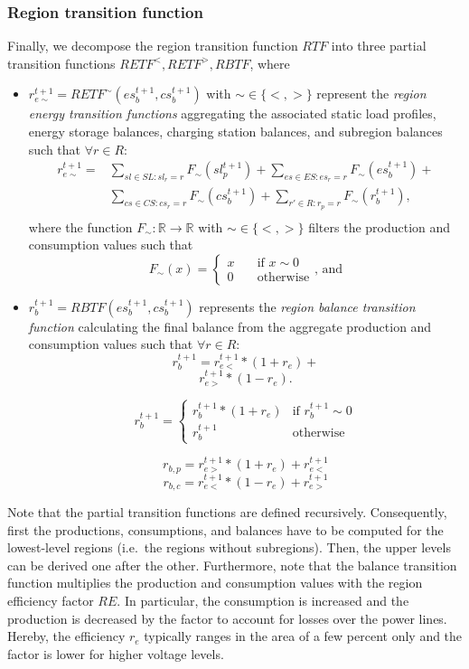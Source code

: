 \subsubsection{Region transition function}
\label{transitions_regions}

Finally, we decompose the region transition function $RTF$ into three partial transition functions $RETF^<,RETF^>,RBTF$, where
\begin{itemize}
	\item $r_{e\sim}^{t+1} = RETF^\sim(es_b^{t+1}, cs_b^{t+1})$ with $\sim \in \{<,>\}$ represent the \textit{region energy transition functions} aggregating the associated static load profiles, energy storage balances, charging station balances, and subregion balances such that $\forall r \in R:$
		\begin{equation*}
		\begin{split}
		r_{e\sim}^{t+1} = & \sum_{sl \in SL: sl_r = r} F_\sim(sl_p^{t+1}) + 
		 \sum_{es \in ES: es_r = r} F_\sim(es_b^{t+1}) + \\
		& \sum_{cs \in CS: cs_r = r} F_\sim(cs_b^{t+1}) + 
		 \sum_{r' \in R: r_p = r} F_\sim(r_b^{t+1})\textrm{,} \\
		\end{split}
		\end{equation*}
	where the function $F_\sim: \mathbb{R} \rightarrow \mathbb{R}$ with $\sim \in \{<,>\}$ filters the production and consumption values such that
	\[
		F_\sim(x) = \begin{cases}
			x & \quad \textrm{if } x \sim 0 \\
			0 & \quad \textrm{otherwise}
		\end{cases}
		\textrm{, and}
	\]
	\item $r_b^{t+1} = RBTF(es_b^{t+1}, cs_b^{t+1})$ represents the \textit{region balance transition function} calculating the final balance from the aggregate production and consumption values such that $\forall r \in R:$
	\[
		r_b^{t+1} = r_{e<}^{t+1} * (1 + r_e) +
	\]
	\[
		r_{e>}^{t+1} * (1 - r_e) \textrm{.}
	\]
	
	\[
		r_b^{t+1} = \begin{cases}
		r_b^{t+1} * (1 + r_e) & \textrm{if } r_b^{t+1} \sim 0 \\
		r_b^{t+1} & \textrm{otherwise}
		\end{cases}
	\]
	
	\[
		r_{b,p} =	r_{e>}^{t+1} * (1 + r_e) + r_{e<}^{t+1} 
	\]	
	\[
		r_{b,c} =	r_{e<}^{t+1} * (1 - r_e) + r_{e>}^{t+1} 
	\]	
\end{itemize}
Note that the partial transition functions are defined recursively. Consequently, first the productions, consumptions, and balances have to be computed for the lowest-level regions (i.e.\ the regions without subregions). Then, the upper levels can be derived one after the other. Furthermore, note that the balance transition function multiplies the production and consumption values with the region efficiency factor $RE$. In particular, the consumption is increased and the production is decreased by the factor to account for losses over the power lines. Hereby, the efficiency $r_e$ typically ranges in the area of a few percent only and the factor is lower for higher voltage levels.